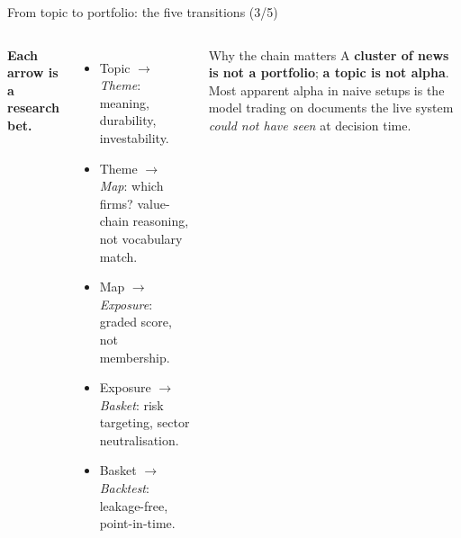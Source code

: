 \documentclass[10pt,aspectratio=169]{beamer}
\begin{document}
\begin{frame}[t]{From topic to portfolio: the five transitions (3/5)}
  \footnotesize

  \begin{center}
  \end{center}

  \vspace{0.15cm}
  \begin{columns}[T,onlytextwidth]
      \textbf{Each arrow is a research bet.}\\[0.05cm]
      \begin{itemize}\setlength\itemsep{0.04cm}
        \item Topic \(\to\) \emph{Theme}: meaning, durability, investability.
        \item Theme \(\to\) \emph{Map}: which firms? value-chain reasoning, not vocabulary match.
        \item Map \(\to\) \emph{Exposure}: graded score, not membership.
        \item Exposure \(\to\) \emph{Basket}: risk targeting, sector neutralisation.
        \item Basket \(\to\) \emph{Backtest}: leakage-free, point-in-time.
      \end{itemize}

      \begin{block}{Why the chain matters}
        \footnotesize
        A \textbf{cluster of news is not a portfolio};
        \textbf{a topic is not alpha}.
        Most apparent alpha in naive setups is the model trading on
        documents the live system \emph{could not have seen} at decision time.
      \end{block}
  \end{columns}

\end{frame}
\end{document}
